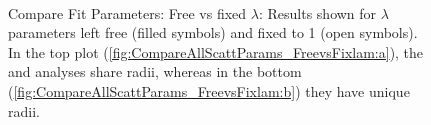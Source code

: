 \documentclass[../AnalysisNoteJBuxton.tex]{subfiles}
\begin{document}
\begin{figure}[h!]
  \centering
  \\  
  \caption[Compare Fit Parameters: Free vs fixed $\lambda$]{Compare Fit Parameters: Free vs fixed $\lambda$:  Results shown for $\lambda$ parameters left free (filled symbols) and fixed to 1 (open symbols).  In the top plot (\ref{fig:CompareAllScattParams_FreevsFixlam:a}), the \LamKchP and \LamKchM analyses share radii, whereas in the bottom (\ref{fig:CompareAllScattParams_FreevsFixlam:b}) they have unique radii.}
  \label{fig:CompareAllScattParams_FreevsFixlam}
\end{figure}
\end{document}
